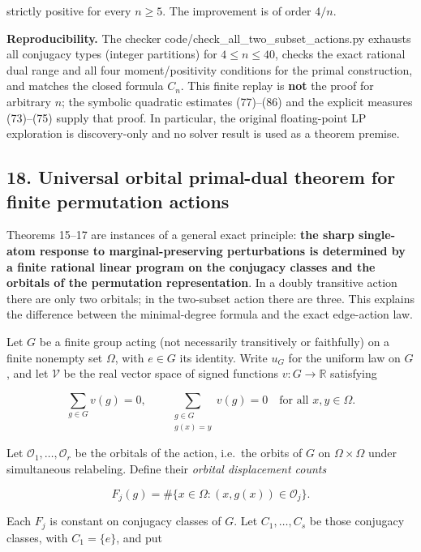 \documentclass[
  11pt,
]{article}
\begin{document}
strictly positive for every \(n\ge5\). The improvement is of order
\(4/n\).

\textbf{Reproducibility.} The checker
code/check\_all\_two\_subset\_actions.py exhausts all conjugacy types
(integer partitions) for \(4\le n\le40\), checks the exact rational dual
range and all four moment/positivity conditions for the primal
construction, and matches the closed formula \(C_n\). This finite replay
is \textbf{not} the proof for arbitrary \(n\); the symbolic quadratic
estimates (77)--(86) and the explicit measures (73)--(75) supply that
proof. In particular, the original floating-point LP exploration is
discovery-only and no solver result is used as a theorem premise.

\subsection{18. Universal orbital primal-dual theorem for finite
permutation
actions}\label{universal-orbital-primal-dual-theorem-for-finite-permutation-actions}

Theorems 15--17 are instances of a general exact principle: \textbf{the
sharp single-atom response to marginal-preserving perturbations is
determined by a finite rational linear program on the conjugacy classes
and the orbitals of the permutation representation}. In a doubly
transitive action there are only two orbitals; in the two-subset action
there are three. This explains the difference between the minimal-degree
formula and the exact edge-action law.

Let \(G\) be a finite group acting (not necessarily transitively or
faithfully) on a finite nonempty set \(\Omega\), with \(e\in G\) its
identity. Write \(u_G\) for the uniform law on \(G\), and let
\(\mathcal V\) be the real vector space of signed functions
\(v:G\to\mathbb R\) satisfying

\[
\sum_{g\in G}v(g)=0,\qquad
\sum_{\substack{g\in G\\g(x)=y}}v(g)=0
\quad\text{for all }x,y\in\Omega. \tag{87}
\]

Let \(\mathcal O_1,\ldots,\mathcal O_r\) be the orbitals of the action,
i.e.~the orbits of \(G\) on \(\Omega\times\Omega\) under simultaneous
relabeling. Define their \emph{orbital displacement counts}

\[
F_j(g)=\#\{x\in\Omega:(x,g(x))\in\mathcal O_j\}. \tag{88}
\]

Each \(F_j\) is constant on conjugacy classes of \(G\). Let
\(C_1,\ldots,C_s\) be those conjugacy classes, with \(C_1=\{e\}\), and
put
\end{document}
